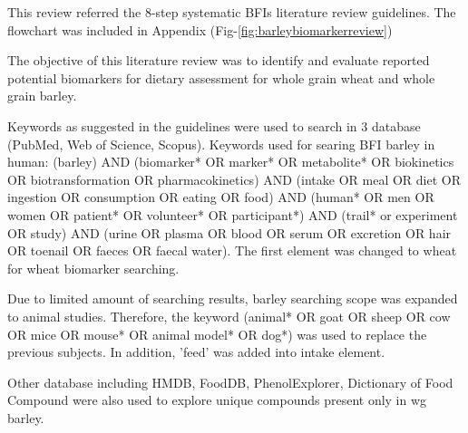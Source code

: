 This review referred the 8-step systematic BFIs literature review guidelines\cite{Pratico2018}. The flowchart was included in Appendix (Fig-\ref{fig:barleybiomarkerreview})

The objective of this literature review was to identify and evaluate reported potential biomarkers for dietary assessment for whole grain wheat and whole grain barley.

Keywords as suggested in the guidelines\cite{Pratico2018} were used to search in 3 database (PubMed, Web of Science, Scopus). Keywords used for searing BFI barley in human: 
(barley) AND (biomarker* OR marker* OR metabolite* OR biokinetics OR biotransformation OR pharmacokinetics) AND (intake OR meal OR diet OR ingestion OR consumption OR eating OR food) AND 
(human* OR men OR women OR patient* OR volunteer* OR participant*) AND 
(trail* or experiment OR study) AND (urine OR plasma OR blood OR serum OR excretion OR hair OR toenail OR faeces OR faecal water). The first element was changed to wheat for wheat biomarker searching. 

Due to limited amount of searching results, barley searching scope was expanded to animal studies. Therefore, the keyword (animal* OR goat OR sheep OR cow OR mice OR mouse* OR animal model* OR dog*) was used to replace the previous subjects. In addition, 'feed' was added into intake element.

Other database including HMDB\cite{hmdb}, FoodDB\cite{foodb}, PhenolExplorer\cite{phenolexplorer}, Dictionary of Food Compound\cite{dictionary} were also used to explore unique compounds present only in \acrshort{wg} barley.
